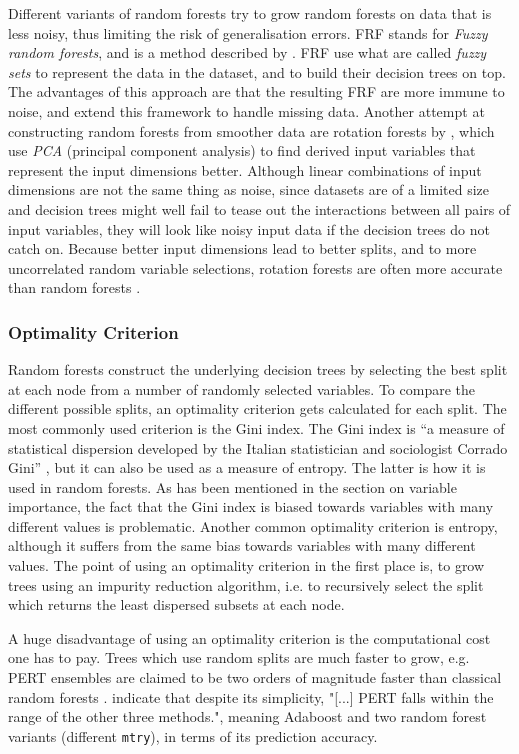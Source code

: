 \documentclass[a4paper,man,12pt,apacite,floatsintext,draftfirst]{apa6} %
\begin{document}
Different variants of random forests try to grow random forests on data
that is less noisy, thus limiting the risk of generalisation errors.
FRF stands for \emph{Fuzzy random forests}, and is a method described by
.
FRF use what are called \emph{fuzzy sets} to represent the data in the dataset,
and to build their decision trees on top.
The advantages of this approach are that the resulting FRF are more immune
to noise, and  extend this framework to
handle missing data.
Another attempt at constructing random forests from smoother data are
rotation forests by \cite{rodriguez2006rotation}, which use
\emph{PCA} (principal component analysis) to find derived input variables that
represent the input dimensions better.
Although linear combinations of input dimensions are not the same thing
as noise, since datasets are of a limited size and decision trees
might well fail to tease out the interactions between all pairs of input
variables, they will look like noisy input data if the decision trees
do not catch on.
Because better input dimensions lead to better splits, and to more
uncorrelated random variable selections, rotation forests are often more
accurate than random forests \cite{rodriguez2006rotation}.

\subsubsection{Optimality Criterion}
Random forests construct the underlying decision trees by selecting the
best split at each node from a number of randomly selected variables.
To compare the different possible splits, an optimality criterion gets
calculated for each split.
The most commonly used criterion is the Gini index.
The Gini index is “a measure of statistical dispersion developed by the
Italian statistician and sociologist Corrado Gini” \cite{wpGINI},
but it can also be used as a measure of entropy.
The latter is how it is used in random forests.
As has been mentioned in the section on variable importance, the fact that
the Gini index is biased towards variables with many different values
is problematic.
Another common optimality criterion is entropy, although it suffers from
the same bias towards variables with many different values.
The point of using an optimality criterion in the first place is,
to grow trees using an impurity reduction algorithm, i.e. to recursively select the split
which returns the least dispersed subsets at each node.

A huge disadvantage of using an optimality criterion is the computational cost
one has to pay.
Trees which use random splits are much faster to grow, e.g. PERT ensembles
are claimed to be two orders of magnitude faster than classical
random forests \cite{cutler2001pert}.
 indicate that despite its simplicity,
"[...] PERT falls within the range of the other three methods.", meaning
Adaboost and two random forest variants (different \texttt{mtry}),
in terms of its prediction accuracy.
\end{document}

